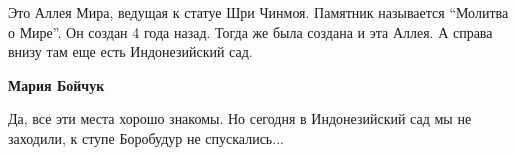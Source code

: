  
 
 
 
 


Это Аллея Мира, ведущая к статуе Шри Чинмоя. Памятник называется \enquote{Молитва о
Мире}. Он создан 4 года назад. Тогда же была создана и эта Аллея. А справа
внизу там еще есть Индонезийский сад.

\textbf{Мария Бойчук} 

Да, все эти места хорошо знакомы. Но сегодня в Индонезийский сад мы не
заходили, к ступе Боробудур не спускались...
